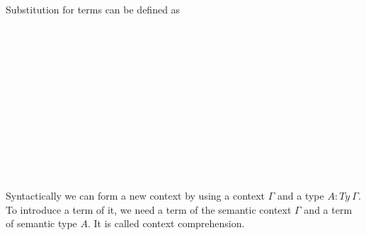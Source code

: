 Substitution for terms can be defined as

\begin{code}\>\<%
\\
%
\\
\> \AgdaSymbol{:}  \AgdaSymbol{\{}  \AgdaSymbol{:} \AgdaSymbol{\}\{} \AgdaSymbol{:}  \AgdaSymbol{\}}  \<[34]%
\>[34]\<%
\\
\>[0]\<[10]%
\>[10]   \<[17]%
\>[17]\<%
\\
\>[0]\<[10]%
\>[10]\AgdaSymbol{(} \AgdaSymbol{:}   \AgdaSymbol{)} \<[22]%
\>[22]\<%
\\
\>[0]\<[10]%
\>[10]  \AgdaSymbol{(} \AgdaFunction{[}  \AgdaFunction{]T}\AgdaSymbol{)}\<%
\\
\>   \AgdaSymbol{=}  \<[19]%
\>[19]\<%
\\
\>[0]\<[10]%
\>[10]\AgdaSymbol{\{}  \AgdaSymbol{=} \AgdaFunction{[}  \AgdaFunction{]tm}  \AgdaFunction{[}  \AgdaFunction{]fn}\<%
\\
\>[0]\<[10]%
\>[10]\AgdaSymbol{;}  \AgdaSymbol{=} \AgdaFunction{[}  \AgdaFunction{]respt}  \AgdaFunction{[}  \AgdaFunction{]resp} \<[43]%
\>[43]\<%
\\
\>[0]\<[10]%
\>[10]\AgdaSymbol{\}}\<%
\\
%
\\
\>\<\end{code}

Syntactically we can form a new context by using a context $\Gamma$ and a type $A : Ty \:\Gamma$. To introduce a term of it, we need a term of the semantic context $\Gamma$ and a term of semantic type $A$. It is called context comprehension. 

